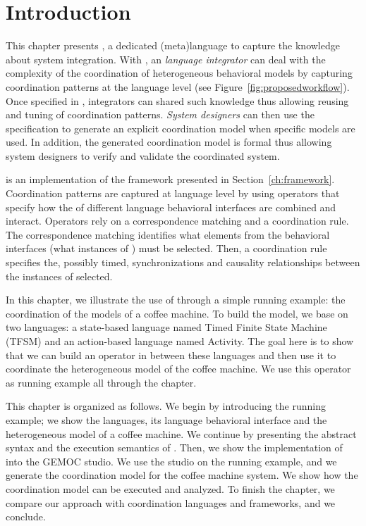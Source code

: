 \section{Introduction}
\label{sec:bcoolintro}
This chapter presents \bcool, a dedicated (meta)language to capture the knowledge about system integration. With \bcool, an \emph{language integrator} can deal with the complexity of the coordination of heterogeneous behavioral models by capturing coordination patterns at the language level (see Figure~\ref{fig:proposedworkflow}). Once specified in \bcool, integrators can shared such knowledge thus allowing reusing and tuning of coordination patterns. \emph{System designers} can then use the \bcool specification to generate an explicit coordination model when specific models are used. In addition, the generated coordination model is formal thus allowing system designers to verify and validate the coordinated system.     
	
\bcool is an implementation of the framework presented in Section~\ref{ch:framework}. Coordination patterns are captured at language level by using operators that specify how the \dse of different language behavioral interfaces are combined and interact. Operators rely on a correspondence matching and a coordination rule. The correspondence matching identifies what elements from the behavioral interfaces (\ie what instances of \dse) must be selected. Then, a coordination rule specifies the, possibly timed, synchronizations and causality relationships between the instances of \dse selected.

In this chapter, we illustrate the use of \bcool through a simple running example: the coordination of the models of a coffee machine. To build the model, we base on two languages: a state-based language named Timed Finite State Machine (TFSM) and an action-based language named Activity. The goal here is to show that we can build an operator in \bcool between these languages and then use it to coordinate the heterogeneous model of the coffee machine. We use this operator as running example all through the chapter. 
	
This chapter is organized as follows. We begin by introducing the running example; we show the languages, its language behavioral interface and the heterogeneous model of a coffee machine. We continue by presenting the abstract syntax and the execution semantics of \bcool. Then, we show the implementation of \bcool into the GEMOC studio. We use the studio on the running example, and we generate the coordination model for the coffee machine system. We show how the coordination model can be executed and analyzed. To finish the chapter, we compare our approach with coordination languages and frameworks, and we conclude.

